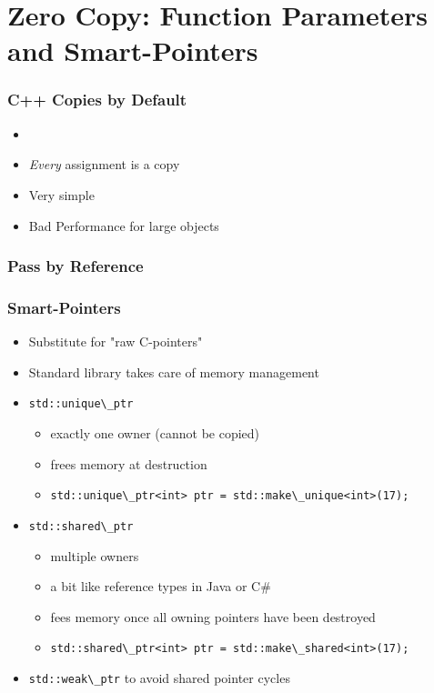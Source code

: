 \documentclass[usenames,dvipsnames,svgnames,table,aspectratio=169]{beamer}
\begin{document}
\section{Zero Copy: Function Parameters and Smart-Pointers}
\begin{frame}
    \frametitle{C++ Copies by Default}
    \begin{itemize}
        \item<+-> 
        \item<+-> \textit{Every} assignment is a copy
        \item<+-> Very simple
        \item<+-> Bad Performance for large objects
    \end{itemize}
\end{frame}

\begin{frame}
    \frametitle{Pass by Reference}
    
\end{frame}

\begin{frame}
    \frametitle{Smart-Pointers}
    \begin{itemize}
        \item<+-> Substitute for "raw C-pointers"
        \item<+-> Standard library takes care of memory management
        \item<+-> \lstinline{std::unique\_ptr}
        \begin{itemize}
            \item<+-> exactly one owner (cannot be copied) 
            \item<+-> frees memory at destruction
            \item<+-> \lstinline{std::unique\_ptr<int> ptr = std::make\_unique<int>(17);}
        \end{itemize}
        \item<+-> \lstinline{std::shared\_ptr}
        \begin{itemize}
            \item<+-> multiple owners
            \item<+-> a bit like reference types in Java or C\#
            \item<+-> fees memory once all owning pointers have been destroyed
            \item<+-> \lstinline{std::shared\_ptr<int> ptr = std::make\_shared<int>(17);}
        \end{itemize}
        \item<+-> \lstinline{std::weak\_ptr} to avoid shared pointer cycles
    \end{itemize}
\end{frame}
\end{document}
